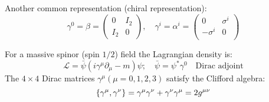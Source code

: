Another common representation (chiral representation):
\begin{equation}
    \gamma^0 = \beta = \begin{pmatrix} 0 & I_2 \\ I_2 & 0 \end{pmatrix}, \quad
    \gamma^i = \alpha^i = \begin{pmatrix} 0 & \sigma^i \\ -\sigma^i & 0 \\ \end{pmatrix}
\end{equation}


For a massive spinor (spin $1/2$) field the Lagrangian density is:
$$ \mathcal{L} = \bar{\psi}(i\gamma^{\mu}\partial_{\mu} - m)\psi; \quad
\bar{\psi} = \psi^{*}\gamma^{0} \quad \text{Dirac adjoint} $$
The $4 \times 4$ Dirac matrices $\gamma^{\mu} (\mu = 0,1,2,3)$ satisfy the
Clifford algebra:
\[ 
    \{\gamma^{\mu},\gamma^{\nu}\}=\gamma^{\mu}\gamma^{\nu}+\gamma^{\nu}\gamma^{\mu}=2g^{\mu\nu} 
\]

